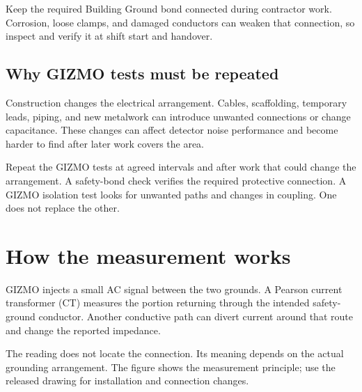 \documentclass[11pt]{article}
\begin{document}
Keep the required Building Ground bond connected during contractor work. Corrosion, loose clamps, and damaged conductors can weaken that connection, so inspect and verify it at shift start and handover.

\subsection{Why GIZMO tests must be repeated}

Construction changes the electrical arrangement. Cables, scaffolding, temporary leads, piping, and new metalwork can introduce unwanted connections or change capacitance. These changes can affect detector noise performance and become harder to find after later work covers the area.

Repeat the GIZMO tests at agreed intervals and after work that could change the arrangement. A safety-bond check verifies the required protective connection. A GIZMO isolation test looks for unwanted paths and changes in coupling. One does not replace the other.

\section{How the measurement works}\label{sec:measurement}

GIZMO injects a small AC signal between the two grounds. A Pearson current transformer (CT) measures the portion returning through the intended safety-ground conductor. Another conductive path can divert current around that route and change the reported impedance.

The reading does not locate the connection. Its meaning depends on the actual grounding arrangement. The figure shows the measurement principle; use the released drawing for installation and connection changes.
\end{document}
